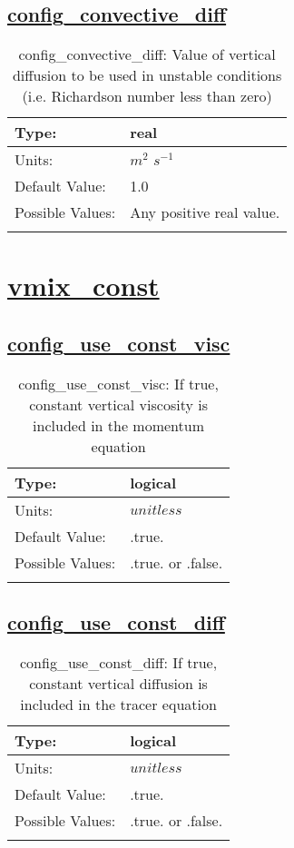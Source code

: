 \subsection[config\_convective\_diff]{\hyperref[sec:nm_tab_vmix]{config\_convective\_diff}}
\label{subsec:nm_sec_config_convective_diff}
\begin{center}
\begin{longtable}{| p{2.0in} | p{4.0in} |}
    \hline
    Type: & real \\
    \hline
    Units: & $m^2$ $s^{-1}$ \\
    \hline
    Default Value: & 1.0 \\
    \hline
    Possible Values: & Any positive real value. \\
    \hline
    \caption{config\_convective\_diff: Value of vertical diffusion to be used in unstable conditions (i.e. Richardson number less than zero)}
\end{longtable}
\end{center}
\section[vmix\_const]{\hyperref[sec:nm_tab_vmix_const]{vmix\_const}}
\label{sec:nm_sec_vmix_const}
\subsection[config\_use\_const\_visc]{\hyperref[sec:nm_tab_vmix_const]{config\_use\_const\_visc}}
\label{subsec:nm_sec_config_use_const_visc}
\begin{center}
\begin{longtable}{| p{2.0in} | p{4.0in} |}
    \hline
    Type: & logical \\
    \hline
    Units: & $unitless$ \\
    \hline
    Default Value: & .true. \\
    \hline
    Possible Values: & .true. or .false. \\
    \hline
    \caption{config\_use\_const\_visc: If true, constant vertical viscosity is included in the momentum equation}
\end{longtable}
\end{center}
\subsection[config\_use\_const\_diff]{\hyperref[sec:nm_tab_vmix_const]{config\_use\_const\_diff}}
\label{subsec:nm_sec_config_use_const_diff}
\begin{center}
\begin{longtable}{| p{2.0in} | p{4.0in} |}
    \hline
    Type: & logical \\
    \hline
    Units: & $unitless$ \\
    \hline
    Default Value: & .true. \\
    \hline
    Possible Values: & .true. or .false. \\
    \hline
    \caption{config\_use\_const\_diff: If true, constant vertical diffusion is included in the tracer equation}
\end{longtable}
\end{center}
